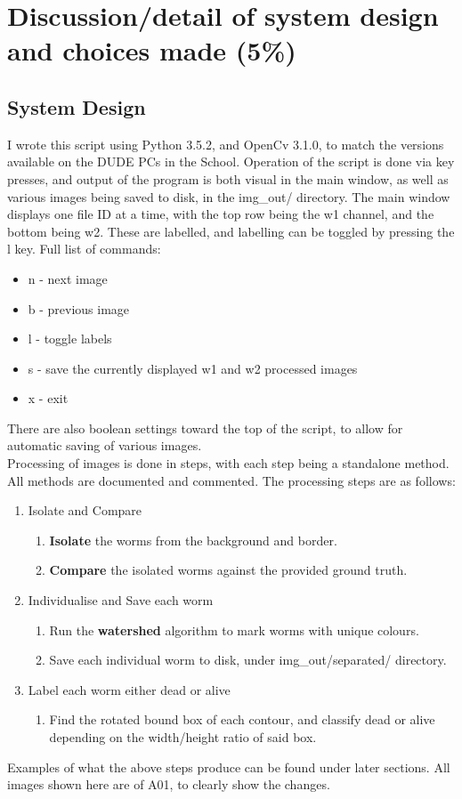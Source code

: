 \documentclass[a4paper,12pt]{article}
\begin{document}
\section*{Discussion/detail of system design and choices made (5\%)}
\subsection*{System Design}
I wrote this script using Python 3.5.2, and OpenCv 3.1.0, to match the versions available on the DUDE PCs in the School.
Operation of the script is done via key presses, and output of the program is both visual in the main window, as well as various images being saved to disk, in the img\_out/ directory.
The main window displays one file ID at a time, with the top row being the w1 channel, and the bottom being w2. These are labelled, and labelling can be toggled by pressing the l key.
Full list of commands:
\begin{itemize}
    \item n - next image
    \item b - previous image
    \item l - toggle labels
    \item s - save the currently displayed w1 and w2 processed images
    \item x - exit
\end{itemize}
There are also boolean settings toward the top of the script, to allow for automatic saving of various images. \\
Processing of images is done in steps, with each step being a standalone method. All methods are documented and commented. The processing steps are as follows:
\begin{enumerate}
    \item Isolate and Compare
    \begin{enumerate}
        \item\textbf{Isolate} the worms from the background and border.
        \item\textbf{Compare} the isolated worms against the provided ground truth.
    \end{enumerate}

    \item Individualise and Save each worm
    \begin{enumerate}
        \item Run the \textbf{watershed} algorithm to mark worms with unique colours.
        \item Save each individual worm to disk, under img\_out/separated/ directory.
    \end{enumerate}

    \item Label each worm either dead or alive
    \begin{enumerate}
        \item Find the rotated bound box of each contour, and classify dead or alive depending on the width/height ratio of said box.
    \end{enumerate}
\end{enumerate}
Examples of what the above steps produce can be found under later sections. All images shown here are of A01, to clearly show the changes.
\end{document}
